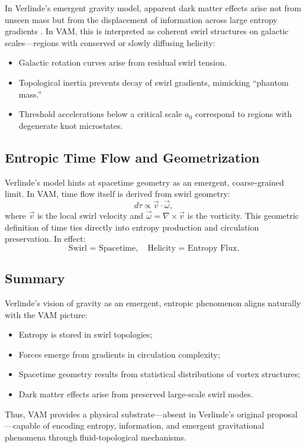 In Verlinde’s emergent gravity model, apparent dark matter effects arise not from unseen mass but from the displacement of information across large entropy gradients \cite{Verlinde2016}. In VAM, this is interpreted as coherent swirl structures on galactic scales—regions with conserved or slowly diffusing helicity:
\begin{itemize}
    \item Galactic rotation curves arise from residual swirl tension.
    \item Topological inertia prevents decay of swirl gradients, mimicking “phantom mass.”
    \item Threshold accelerations below a critical scale $a_0$ correspond to regions with degenerate knot microstates.
\end{itemize}

\subsection*{Entropic Time Flow and Geometrization}

Verlinde’s model hints at spacetime geometry as an emergent, coarse-grained limit. In VAM, time flow itself is derived from swirl geometry:
\begin{equation}
d\tau \propto \vec{v} \cdot \vec{\omega},
\end{equation}
where $\vec{v}$ is the local swirl velocity and $\vec{\omega} = \nabla \times \vec{v}$ is the vorticity. This geometric definition of time ties directly into entropy production and circulation preservation. In effect:
\[
\text{Swirl = Spacetime}, \quad \text{Helicity = Entropy Flux}.
\]

\subsection*{Summary}

Verlinde’s vision of gravity as an emergent, entropic phenomenon aligns naturally with the VAM picture:
\begin{itemize}
    \item Entropy is stored in swirl topologies;
    \item Forces emerge from gradients in circulation complexity;
    \item Spacetime geometry results from statistical distributions of vortex structures;
    \item Dark matter effects arise from preserved large-scale swirl modes.
\end{itemize}
Thus, VAM provides a physical substrate—absent in Verlinde’s original proposal—capable of encoding entropy, information, and emergent gravitational phenomena through fluid-topological mechanisms.

